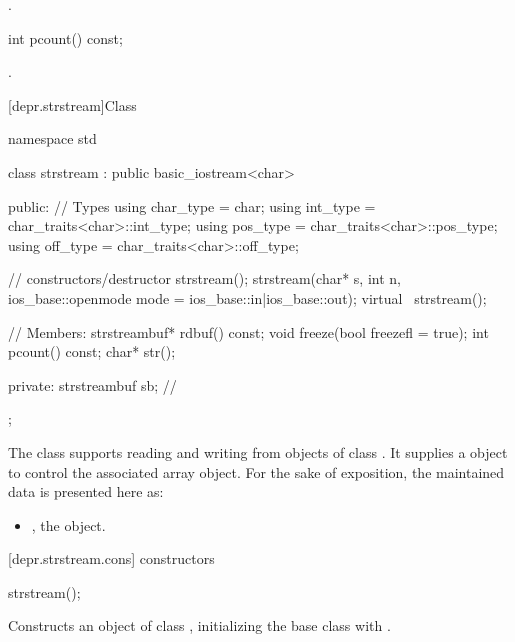 \begin{itemdescr}
\pnum
\returns
{}.
\end{itemdescr}

%
\begin{itemdecl}
int pcount() const;
\end{itemdecl}

\begin{itemdescr}
\pnum
\returns
{}.
\end{itemdescr}

[depr.strstream]{Class }

%
\begin{codeblock}
namespace std {
  class strstream
    : public basic_iostream<char> {
  public:
    // Types
    using char_type = char;
    using int_type  = char_traits<char>::int_type;
    using pos_type  = char_traits<char>::pos_type;
    using off_type  = char_traits<char>::off_type;

    // constructors/destructor
    strstream();
    strstream(char* s, int n,
              ios_base::openmode mode = ios_base::in|ios_base::out);
    virtual ~strstream();

    // Members:
    strstreambuf* rdbuf() const;
    void freeze(bool freezefl = true);
    int pcount() const;
    char* str();

  private:
  strstreambuf sb;  // \expos
  };
}
\end{codeblock}

\pnum
The class
supports reading and writing from objects of class
.
It supplies a
object to control the associated array object.
For the sake of exposition, the maintained data is presented here as:

\begin{itemize}
\item
{}, the  object.
\end{itemize}

[depr.strstream.cons]{ constructors}

%
\begin{itemdecl}
strstream();
\end{itemdecl}

\begin{itemdescr}
\pnum
\effects
Constructs an object of class
,
initializing the base class with
.
\end{itemdescr}

